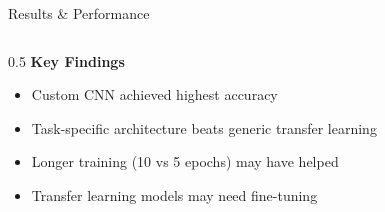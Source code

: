 \documentclass[aspectratio=169]{beamer}
\begin{document}
\begin{frame}{Results \& Performance}
\begin{columns}[T]
\begin{column}{0.5\textwidth}
            \vspace{-0.4cm}
            \textbf{Key Findings}
            \begin{itemize}
                \scriptsize
                \item Custom CNN achieved highest accuracy
                \item Task-specific architecture beats generic transfer learning
                \item Longer training (10 vs 5 epochs) may have helped
                \item Transfer learning models may need fine-tuning
            \end{itemize}
        \end{column}
    \end{columns}
\end{frame}
\end{document}
